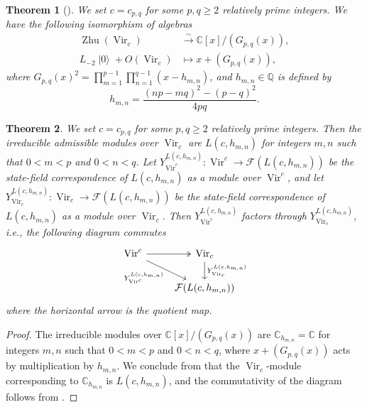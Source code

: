 \documentclass[a4paper, 12pt, reqno]{amsart}
\newtheorem{theorem}{Theorem}[section]
\theoremstyle{remark}
\DeclareMathOperator{\Vir}{Vir}
\DeclareMathOperator{\vac}{|0\rangle}
\DeclareMathOperator{\Zhu}{Zhu}
\begin{document}
\begin{theorem}[{\cite{wang_rationality_1993}}]
  \label{thr:43}
  We set $c = c_{p, q}$ for some $p, q \ge 2$ relatively prime integers.
  We have the following isomorphism of algebras
  \begin{align*}
    \Zhu(\Vir_c) &\xrightarrow{\sim} \mathbb{C}[x]/(G_{p, q}(x)), \\
    L_{-2}\vac + O(\Vir_c) &\mapsto x + (G_{p, q}(x)),
  \end{align*}
  where $G_{p ,q}(x)^2 = \prod_{m = 1}^{p - 1}\prod_{n = 1}^{q - 1}(x - h_{m, n})$, and $h_{m, n} \in \mathbb{Q}$ is defined by
  \begin{equation}
    \label{eq:39}
    h_{m, n} = \frac{(np - mq)^2 - (p - q)^2}{4pq}.
  \end{equation}
\end{theorem}

\begin{theorem}
  \label{thr:44}
  We set $c = c_{p, q}$ for some $p, q \ge 2$ relatively prime integers.
  Then the irreducible admissible modules over $\Vir_c$ are $L(c, h_{m, n})$ for integers $m, n$ such that $0 < m < p$ and $0 < n < q$.
  Let $Y^{L(c, h_{m, n})}_{\Vir^c}: \Vir^c \to \mathcal{F}(L(c, h_{m, n}))$ be the state-field correspondence of $L(c, h_{m, n})$ as a module over $\Vir^c$, and let $Y^{L(c, h_{m, n})}_{\Vir_c}: \Vir_c \to \mathcal{F}(L(c, h_{m, n}))$ be the state-field correspondence of $L(c, h_{m, n})$ as a module over $\Vir_c$.
  Then $Y^{L(c, h_{m, n})}_{\Vir^c}$ factors through $Y^{L(c, h_{m, n})}_{\Vir_c}$, i.e., the following diagram commutes
  \begin{equation*}
    \begin{tikzcd}
      \Vir^c \arrow[r, two heads] \arrow[rd, "{Y^{L(c, h_{m, n})}_{\Vir^c}}"'] & {\Vir_c} \arrow[d, "{Y^{L(c, h_{m, n})}_{\Vir_c}}"] \\
      & {\mathcal{F}(L(c, h_{m, n}))}
    \end{tikzcd}
  \end{equation*}
  where the horizontal arrow is the quotient map.
\end{theorem}

\begin{proof}
  The irreducible modules over $\mathbb{C}[x]/(G_{p, q}(x))$ are $\mathbb{C}_{h_{m, n}} = \mathbb{C}$ for integers $m, n$ such that $0 < m < p$ and $0 < n < q$, where $x + (G_{p, q}(x))$ acts by multiplication by $h_{m, n}$.
  We conclude from  that the $\Vir_c$-module corresponding to $\mathbb{C}_{h_{m, n}}$ is $L(c, h_{m, n})$, and the commutativity of the diagram follows from .
\end{proof}
\end{document}

